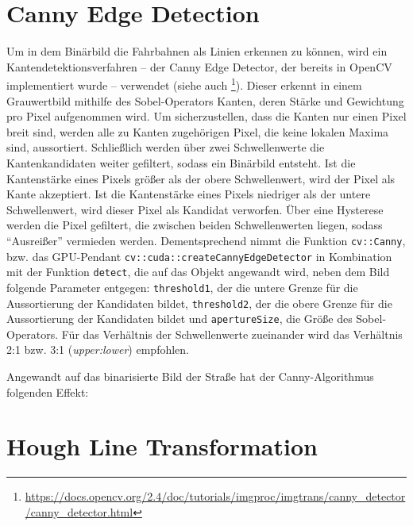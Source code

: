 \documentclass[a4paper,12pt]{report}
\begin{document}
\section{Canny Edge Detection} %
	Um in dem Binärbild die Fahrbahnen als Linien erkennen zu können, wird ein Kantendetektionsverfahren -- der Canny Edge Detector, der bereits in OpenCV implementiert wurde -- verwendet (siehe auch \footnote{\url{https://docs.opencv.org/2.4/doc/tutorials/imgproc/imgtrans/canny\_detector/canny\_detector.html}}). Dieser erkennt in einem Grauwertbild mithilfe des Sobel-Operators Kanten, deren Stärke und Gewichtung pro Pixel aufgenommen wird. Um sicherzustellen, dass die Kanten nur einen Pixel breit sind, werden alle zu Kanten zugehörigen Pixel, die keine lokalen Maxima sind, aussortiert. Schließlich werden über zwei Schwellenwerte die Kantenkandidaten weiter gefiltert, sodass ein Binärbild entsteht. Ist die Kantenstärke eines Pixels größer als der obere Schwellenwert, wird der Pixel als Kante akzeptiert. Ist die Kantenstärke eines Pixels niedriger als der untere Schwellenwert, wird dieser Pixel als Kandidat verworfen. Über eine Hysterese werden die Pixel gefiltert, die zwischen beiden Schwellenwerten liegen, sodass "`Ausreißer"' vermieden werden. Dementsprechend nimmt die Funktion \texttt{cv::Canny}, bzw. das GPU-Pendant \texttt{cv::cuda::createCannyEdgeDetector} in Kombination mit der Funktion \texttt{detect}, die auf das Objekt angewandt wird, neben dem Bild folgende Parameter entgegen: \texttt{threshold1}, der die untere Grenze für die Aussortierung der Kandidaten bildet, \texttt{threshold2}, der die obere Grenze für die Aussortierung der Kandidaten bildet und \texttt{apertureSize}, die Größe des Sobel-Operators. Für das Verhältnis der Schwellenwerte zueinander wird das Verhältnis 2:1 bzw. 3:1 (\textit{upper:lower}) empfohlen.

	Angewandt auf das binarisierte Bild der Straße hat der Canny-Algorithmus folgenden Effekt:


\section{Hough Line Transformation}
\end{document}
